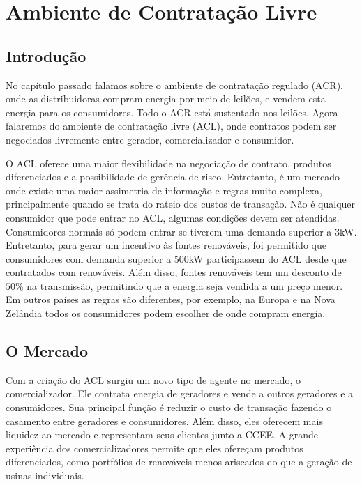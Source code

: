 \section{Ambiente de Contratação Livre}

\subsection{Introdução}

No capítulo passado falamos sobre o ambiente de contratação regulado (ACR), onde as distribuidoras compram energia por meio de leilões, e vendem esta energia para os consumidores. Todo o ACR está sustentado nos leilões. Agora falaremos do ambiente de contratação livre (ACL), onde contratos podem ser negociados livremente entre gerador, comercializador e consumidor. 

O ACL oferece uma maior flexibilidade na negociação de contrato, produtos diferenciados e a possibilidade de gerência de risco. Entretanto, é um mercado onde existe uma maior assimetria de informação e regras muito complexa, principalmente quando se trata do rateio dos custos de transação. Não é qualquer consumidor que pode entrar no ACL, algumas condições devem ser atendidas. Consumidores normais só podem entrar se tiverem uma demanda superior a 3kW. Entretanto, para gerar um incentivo às fontes renováveis, foi permitido que consumidores com demanda superior a 500kW participassem do ACL desde que contratados com renováveis. Além disso, fontes renováveis tem um desconto de $50\%$ na transmissão, permitindo que a energia seja vendida a um preço menor. Em outros países as regras são diferentes, por exemplo, na Europa e na Nova Zelândia todos os consumidores podem escolher de onde compram energia. 

\subsection{O Mercado}

Com a criação do ACL surgiu um novo tipo de agente no mercado, o comercializador. Ele contrata energia de geradores e vende a outros geradores e a consumidores. Sua principal função é reduzir o custo de transação fazendo o casamento entre geradores e consumidores. Além disso, eles oferecem mais liquidez ao mercado e representam seus clientes junto a CCEE. A grande experiência dos comercializadores permite que eles ofereçam produtos diferenciados, como portfólios de renováveis menos ariscados do que a geração de usinas individuais. 

